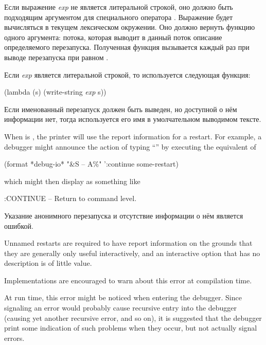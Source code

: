 \begin{defmac}
\begin{flushdesc}
  Если выражение \emph{exp} не является литеральной строкой, оно должно быть
  подходящим аргументом для специального оператора . Выражение
   будет вычисляться в текущем лексическом
  окружении. Оно должно вернуть функцию одного аргумента: потока, которая
  выводит в данный поток описание определяемого перезапуска. Полученная функция
  вызывается каждый раз при выводе перезапуска при  равном
  .

  Если \emph{exp} является литеральной строкой, то используется следующая
  функция:
  \begin{lisp}
    (lambda (s) (write-string \emph{exp} s))
  \end{lisp}

  Если именованный перезапуск должен быть выведен, но доступной о нём информации
  нет, тогда используется его имя в умолчательном выводимом тексте.

  When  is , the printer will use the report
  information for a restart. For example, a debugger might announce the action
  of typing ``'' by executing the equivalent of
  \begin{lisp}
    (format *debug-io* "{\Xtilde}\&{\Xtilde}S -- {\Xtilde}A{\Xtilde}\%" ':continue some-restart)
  \end{lisp}
  which might then display as something like
  \begin{lisp}
    :CONTINUE -- Return to command level.
  \end{lisp}
 
  Указание анонимного перезапуска и отсутствие информации о нём является ошибкой.
\beforenoterule
\begin{rationale}
Unnamed restarts are required to have report information on
the grounds that they are generally only useful interactively, and an
interactive option that has no description is of little value.
\end{rationale}
\betweennoterule
\begin{implementation}
Implementations are encouraged to warn about this error
at compilation time.

At run time, this error might be noticed when entering the debugger. Since
signaling an error would probably cause recursive entry into the debugger
(causing yet another recursive error, and so on), it is suggested that the
debugger print some indication of such problems when they occur, but not
actually signal errors.
\end{implementation}
\afternoterule


\end{flushdesc}
\end{defmac}
